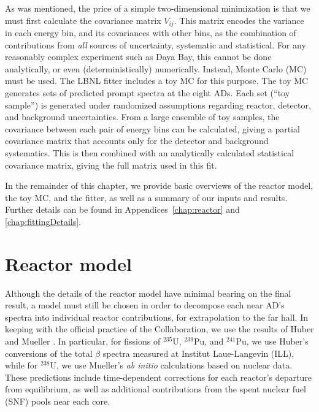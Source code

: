 \documentclass[../thesis.tex]{subfiles}
\begin{document}
As was mentioned, the price of a simple two-dimensional minimization is that we must first calculate the covariance matrix $V_{ij}$. This matrix encodes the variance in each energy bin, and its covariances with other bins, as the combination of contributions from \emph{all} sources of uncertainty, systematic and statistical. For any reasonably complex experiment such as Daya Bay, this cannot be done analytically, or even (deterministically) numerically. Instead, Monte Carlo (MC) must be used. The LBNL fitter includes a toy MC for this purpose. The toy MC generates sets of predicted prompt spectra at the eight ADs. Each set (``toy sample'') is generated under randomized assumptions regarding reactor, detector, and background uncertainties. From a large ensemble of toy samples, the covariance between each pair of energy bins can be calculated, giving a partial covariance matrix that accounts only for the detector and background systematics. This is then combined with an analytically calculated statistical covariance matrix, giving the full matrix used in this fit.

In the remainder of this chapter, we provide basic overviews of the reactor model, the toy MC, and the fitter, as well as a summary of our inputs and results. Further details can be found in Appendices~\ref{chap:reactor} and \ref{chap:fittingDetails}.

\section{Reactor model}
\label{sec:fittingReactor}

Although the details of the reactor model have minimal bearing on the final result, a model must still be chosen in order to decompose each near AD's spectra into individual reactor contributions, for extrapolation to the far hall. In keeping with the official practice of the Collaboration, we use the results of Huber \cite{PhysRevC.84.024617} and Mueller \cite{PhysRevC.83.054615}. In particular, for fissions of $^{235}$U, $^{239}$Pu, and $^{241}$Pu, we use Huber's conversions of the total $\beta$ spectra measured at Institut Laue-Langevin (ILL), while for $^{238}$U, we use Mueller's \emph{ab initio} calculations based on nuclear data. These predictions include time-dependent corrections for each reactor's departure from equilibrium, as well as additional contributions from the spent nuclear fuel (SNF) pools near each core.
\end{document}
